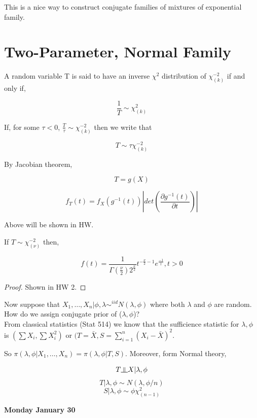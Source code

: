 \documentclass[11pt,fleqn]{book} %
\newcommand{\indep}{\rotatebox[origin=c]{90}{$\models$}}
\begin{document}
This is a nice way to construct conjugate families of mixtures of exponential family. 

\section{Two-Parameter,  Normal Family}

\begin{definition}
	A random variable T is said to have an inverse $\chi^2$ distribution of $\chi^{-2}_{(k)}$ if and only if, 

		$$\frac{1}{T} \sim \chi^2_{(k)} $$

	If, for some $\tau < 0$, $\frac{T}{\tau} \sim \chi^{-2}_{(k)}$ then we write that 

			$$T \sim \tau \chi^{-2}_{(k)} $$

	
\end{definition}

By Jacobian theorem, 

			$$T = g(X) $$

			$$f_T(t) = f_X(g^{-1}(t)) |det(\frac{\partial g^{-1}(t)}{\partial t})| $$

Above will be shown in HW. 

\begin{theorem}
	If $T \sim \chi^{-2}_{(\nu)}$ then, 

			$$f(t) = \frac{1}{\Gamma(\frac{\nu}{2}) 2^{\frac{\nu}{2}}} t^{-\frac{\nu}{2}-1} e^{\frac{-1}{t}}, t > 0 $$
\end{theorem}

\begin{proof}
	Shown in HW 2. 
\end{proof}

Now suppose that $X_1, \dots, X_n | \phi, \lambda \sim^{iid} N(\lambda, \phi)$ where both $\lambda$ and $\phi$ are random. How do we assign conjugate prior of ($\lambda, \phi$)?\\

From classical statistics (Stat 514) we know that the sufficience statistic for $\lambda, \phi$  is $(\sum X_i, \sum X_i^2)$ or $(T = \bar{X}, S = \sum^n_{i=1} (X_i -\bar{X})^2$. 


So $\pi(\lambda, \phi|X_1, \dots, X_n) = \pi(\lambda,\phi | T, S)$. Moreover, form Normal theory, 

		$$T \indep X | \lambda, \phi $$
		$$T | \lambda, \phi \sim N(\lambda, \phi/n) $$
		$$S | \lambda, \phi \sim \phi \chi^2_{(n-1)} $$


\textbf{Monday January 30}\\
\end{document}

